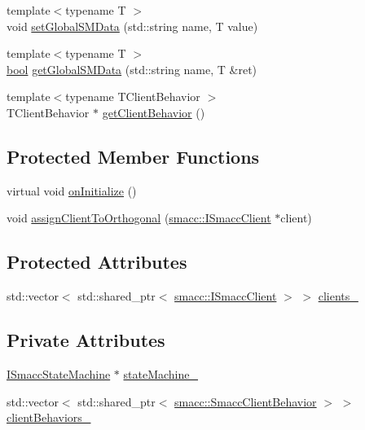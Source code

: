 \begin{DoxyCompactItemize}
\item 
{\footnotesize template$<$typename T $>$ }\\void \hyperlink{classsmacc_1_1ISmaccOrthogonal_a2b5b15907fa6c7c6882717246f0633ab}{set\+Global\+S\+M\+Data} (std\+::string name, T value)
\item 
{\footnotesize template$<$typename T $>$ }\\\hyperlink{classbool}{bool} \hyperlink{classsmacc_1_1ISmaccOrthogonal_aa763280bc6980811744c8e8f11b2dcd0}{get\+Global\+S\+M\+Data} (std\+::string name, T \&ret)
\item 
{\footnotesize template$<$typename T\+Client\+Behavior $>$ }\\T\+Client\+Behavior $\ast$ \hyperlink{classsmacc_1_1ISmaccOrthogonal_a463bb235217511954feb4133394c4c61}{get\+Client\+Behavior} ()
\end{DoxyCompactItemize}
\subsection*{Protected Member Functions}
\begin{DoxyCompactItemize}
\item 
virtual void \hyperlink{classsmacc_1_1ISmaccOrthogonal_a6bb31c620cb64dd7b8417f8705c79c7a}{on\+Initialize} ()
\item 
void \hyperlink{classsmacc_1_1ISmaccOrthogonal_a586a3b5cabae55f2bf1434cd90c1bdfa}{assign\+Client\+To\+Orthogonal} (\hyperlink{classsmacc_1_1ISmaccClient}{smacc\+::\+I\+Smacc\+Client} $\ast$client)
\end{DoxyCompactItemize}
\subsection*{Protected Attributes}
\begin{DoxyCompactItemize}
\item 
std\+::vector$<$ std\+::shared\+\_\+ptr$<$ \hyperlink{classsmacc_1_1ISmaccClient}{smacc\+::\+I\+Smacc\+Client} $>$ $>$ \hyperlink{classsmacc_1_1ISmaccOrthogonal_a0f270e9c8c126198f6bce542ab4e04ba}{clients\+\_\+}
\end{DoxyCompactItemize}
\subsection*{Private Attributes}
\begin{DoxyCompactItemize}
\item 
\hyperlink{classsmacc_1_1ISmaccStateMachine}{I\+Smacc\+State\+Machine} $\ast$ \hyperlink{classsmacc_1_1ISmaccOrthogonal_a418b2e094a65013444ec1fca7e94f28d}{state\+Machine\+\_\+}
\item 
std\+::vector$<$ std\+::shared\+\_\+ptr$<$ \hyperlink{classsmacc_1_1SmaccClientBehavior}{smacc\+::\+Smacc\+Client\+Behavior} $>$ $>$ \hyperlink{classsmacc_1_1ISmaccOrthogonal_ad9e6c0f9055e51a61c9728ac7117dae2}{client\+Behaviors\+\_\+}
\end{DoxyCompactItemize}


